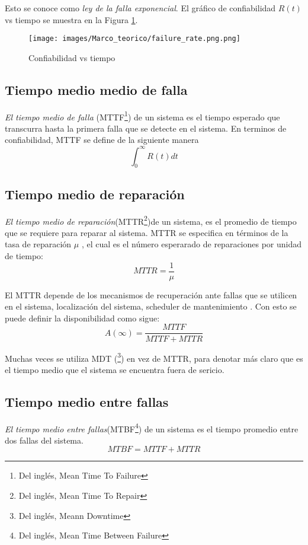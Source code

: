 Esto se conoce como \textit{ley de la falla exponencial}\citep{FTDesign}. El gráfico de confiabilidad $R(t)$ vs tiempo se muestra en la Figura \ref{fig:failure_rate}.

\begin{figure}[h]
 \centering
 \texttt{[image: images/Marco\_teorico/failure\_rate.png.png]}
  \caption{Confiabilidad vs tiempo }
\label{fig:failure_rate}
\end{figure}

\subsection{Tiempo medio medio de falla}
\textit{El tiempo medio de falla} (MTTF\footnote{Del inglés, Mean Time To Failure}) de un sistema es el tiempo esperado que transcurra hasta la primera falla que se
detecte en el sistema. En terminos de confiabilidad, MTTF se define de la siguiente manera \citep{FTDesign} \citep{Rausand04} $$\int_0^{\infty} R(t) dt$$

\subsection{Tiempo medio de reparación}
\textit{El tiempo medio de reparación}(MTTR\footnote{Del inglés, Mean Time To Repair})de un sistema, es el promedio de tiempo que se requiere para reparar al sistema.
MTTR se especifica en términos de la tasa de reparación $\mu$ \citep{FTDesign} \citep{Rausand04}, el cual es el número esperarado de reparaciones por unidad de tiempo: $$MTTR = \frac{1}{\mu}$$

El MTTR depende de los mecanismos de recuperación ante fallas que se utilicen en el sistema, localización del sistema, scheduler de mantenimiento \citep{FTDesign}. Con esto se puede definir la disponibilidad como sigue: $$A(\infty) = \frac{MTTF}{MTTF+MTTR}$$

Muchas veces se utiliza MDT (\footnote{Del inglés, Meann Downtime}) en vez de MTTR, para denotar más claro que es el tiempo medio que el sistema se encuentra fuera de sericio.

\subsection{Tiempo medio entre fallas}
\textit{El tiempo medio entre fallas}(MTBF\footnote{Del inglés, Mean Time Between Failure}) de un sistema es el tiempo promedio entre dos fallas del sistema. $$MTBF = MTTF + MTTR$$

